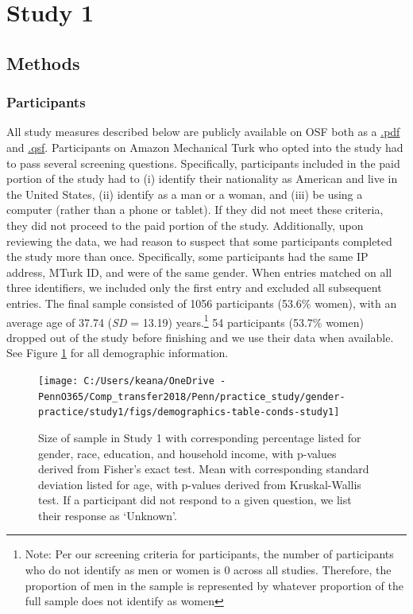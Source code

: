 \documentclass[a4paper, nobind]{templates/ociamthesis}
\begin{document}
\hypertarget{study-1}{%
\section{Study 1}\label{study-1}}

\hypertarget{methods}{%
\subsection{Methods}\label{methods}}

\hypertarget{participants}{%
\subsubsection{Participants}\label{participants}}

All study measures described below are publicly available on OSF both as a \href{https://osf.io/hb9nw/}{.pdf} and \href{https://osf.io/ga24t/}{.qsf}. Participants on Amazon Mechanical Turk who opted into the study had to pass several screening questions. Specifically, participants included in the paid portion of the study had to (i) identify their nationality as American and live in the United States, (ii) identify as a man or a woman, and (iii) be using a computer (rather than a phone or tablet). If they did not meet these criteria, they did not proceed to the paid portion of the study. Additionally, upon reviewing the data, we had reason to suspect that some participants completed the study more than once. Specifically, some participants had the same IP address, MTurk ID, and were of the same gender. When entries matched on all three identifiers, we included only the first entry and excluded all subsequent entries. The final sample consisted of 1056 participants (53.6\% women), with an average age of 37.74 (\emph{SD} = 13.19) years.\footnote{Note: Per our screening criteria for participants, the number of participants who do not identify as men or women is 0 across all studies. Therefore, the proportion of men in the sample is represented by whatever proportion of the full sample does not identify as women} 54 participants (53.7\% women) dropped out of the study before finishing and we use their data when available. See Figure \ref{fig:demographics-table-study1} for all demographic information.

\begin{figure}

{\centering \texttt{[image: C:/Users/keana/OneDrive - PennO365/Comp\_transfer2018/Penn/practice\_study/gender-practice/study1/figs/demographics-table-conds-study1]} 

}

\caption{Size of sample in Study 1 with corresponding percentage listed for gender, race, education, and household income, with p-values derived from Fisher’s exact test. Mean with corresponding standard deviation listed for age, with p-values derived from Kruskal-Wallis test. If a participant did not respond to a given question, we list their response as ‘Unknown’.}\label{fig:demographics-table-study1}
\end{figure}
\end{document}
